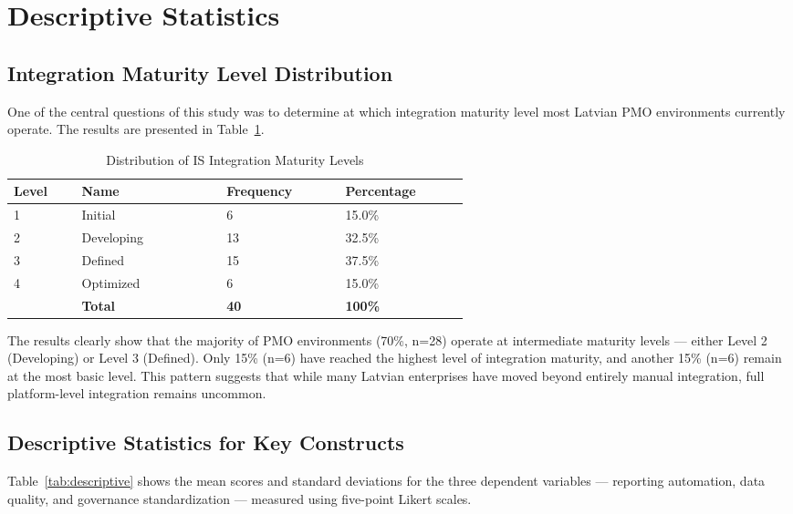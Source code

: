 \section{Descriptive Statistics}
\label{sec:descriptive}

\subsection{Integration Maturity Level Distribution}
One of the central questions of this study was to determine at which
integration maturity level most Latvian PMO environments currently
operate. The results are presented in Table~\ref{tab:imm-distribution}.

{\singlespacing
\begin{table}[h]
  \caption{Distribution of IS Integration Maturity Levels}
  \label{tab:imm-distribution}
  \centering
  \begin{tabular}{p{0.08\linewidth}p{0.20\linewidth}p{0.15\linewidth}p{0.15\linewidth}}
    \toprule
    \textbf{Level} & \textbf{Name} & \textbf{Frequency} & \textbf{Percentage}\\
    \midrule
    1 & Initial & 6 & 15.0\%\\
    2 & Developing & 13 & 32.5\%\\
    3 & Defined & 15 & 37.5\%\\
    4 & Optimized & 6 & 15.0\%\\
    \midrule
    & \textbf{Total} & \textbf{40} & \textbf{100\%}\\
    \bottomrule
  \end{tabular}
\end{table}
}

The results clearly show that the majority of PMO environments (70\%,
n=28) operate at intermediate maturity levels — either Level 2
(Developing) or Level 3 (Defined). Only 15\% (n=6) have reached the
highest level of integration maturity, and another 15\% (n=6) remain
at the most basic level. This pattern suggests that while many Latvian
enterprises have moved beyond entirely manual integration, full
platform-level integration remains uncommon.

\subsection{Descriptive Statistics for Key Constructs}
Table~\ref{tab:descriptive} shows the mean scores and standard
deviations for the three dependent variables — reporting automation,
data quality, and governance standardization — measured using
five-point Likert scales.

